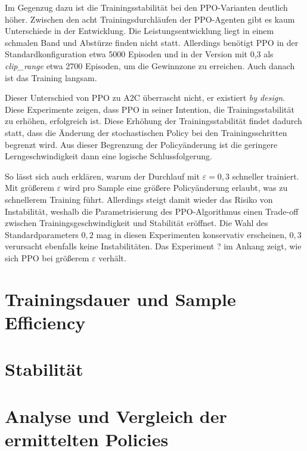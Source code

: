 Im Gegenzug dazu ist die Trainingsstabilität bei den PPO-Varianten deutlich höher.
Zwischen den acht Trainingsdurchläufen der PPO-Agenten gibt es kaum Unterschiede in der Entwicklung.
Die Leistungsentwicklung liegt in einem schmalen Band und Abstürze finden nicht statt.
Allerdings benötigt PPO in der Standardkonfiguration etwa 5000 Episoden und in der Version mit 0,3 als \textit{clip_range} etwa 2700 Episoden, um die Gewinnzone zu erreichen.
Auch danach ist das Training langsam.

Dieser Unterschied von PPO zu A2C überrascht nicht, er existiert \textit{by design}.
Diese Experimente zeigen, dass PPO in seiner Intention, die Trainingsstabilität zu erhöhen, erfolgreich ist.
Diese Erhöhung der Trainingsstabilität findet dadurch statt, dass die Änderung der stochastischen Policy bei den Trainingsschritten begrenzt wird.
Aus dieser Begrenzung der Policyänderung ist die geringere Lerngeschwindigkeit dann eine logische Schlussfolgerung.

So lässt sich auch erklären, warum der Durchlauf mit $\varepsilon=0,3$ schneller trainiert.
Mit größerem $\varepsilon$ wird pro Sample eine größere Policyänderung erlaubt, was zu schnellerem Training führt.
Allerdings steigt damit wieder das Risiko von Instabilität, weshalb die Parametrisierung des PPO-Algorithmus einen Trade-off zwischen Trainingsgeschwindigkeit und Stabilität eröffnet.
Die Wahl des Standardparameters $0,2$ mag in diesen Experimenten konservativ erscheinen, $0,3$ verursacht ebenfalls keine Instabilitäten.
Das Experiment ? im Anhang zeigt, wie sich PPO bei größerem $\varepsilon$ verhält.

\section{Trainingsdauer und Sample Efficiency}

\section{Stabilität}

\section{Analyse und Vergleich der ermittelten Policies}
